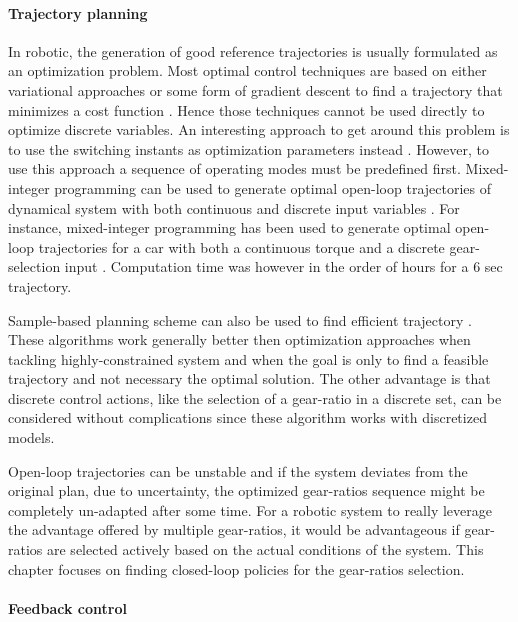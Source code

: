 \paragraph{Trajectory planning}

In robotic, the generation of good reference trajectories is usually formulated as an optimization problem. Most optimal control techniques are based on either variational approaches or some form of gradient descent to find a trajectory that minimizes a cost function \cite{betts_practical_2010}. Hence those techniques cannot be used directly to optimize discrete variables. An interesting approach to get around this problem is to use the switching instants as optimization parameters instead \cite{xu_optimal_2004}\cite{majdoub_hybrid_2010}. However, to use this approach a sequence of operating modes must be predefined first. Mixed-integer programming can be used to generate optimal open-loop trajectories of dynamical system with both continuous and discrete input variables \cite{richards_spacecraft_2002}. For instance, mixed-integer programming has been used to generate optimal open-loop trajectories for a car with both a continuous torque and a discrete gear-selection input \cite{gerdts_solving_2005}. Computation time was however in the order of hours for a 6 sec trajectory. 

Sample-based planning scheme can also be used to find efficient trajectory \cite{lavalle_planning_2006}. These algorithms work generally better then optimization approaches when tackling highly-constrained system and when the goal is only to find a feasible trajectory and not necessary the optimal solution. The other advantage is that discrete control actions, like the selection of a gear-ratio in a discrete set, can be considered without complications since these algorithm works with discretized models.

Open-loop trajectories can be unstable and if the system deviates from the original plan, due to uncertainty, the optimized gear-ratios sequence might be completely un-adapted after some time. For a robotic system to really leverage the advantage offered by multiple gear-ratios, it would be advantageous if gear-ratios are selected actively based on the actual conditions of the system. This chapter focuses on finding closed-loop policies for the gear-ratios selection.

\paragraph{Feedback control}


